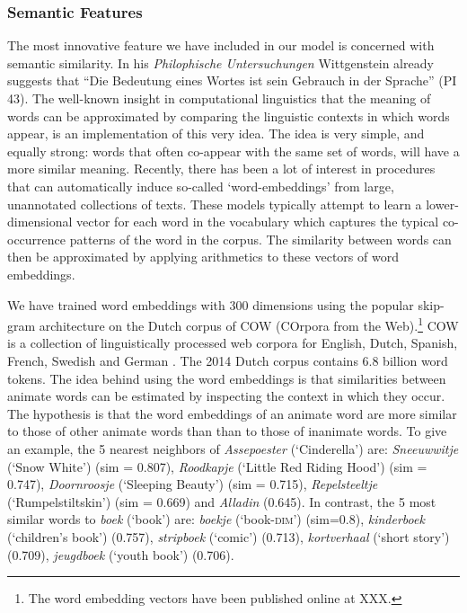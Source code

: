 \documentclass[a4paper,UKenglish]{oasics}
\begin{document}
\subsubsection{Semantic Features} The most innovative feature we have
included in our model is concerned with semantic similarity. In his
\textit{Philophische Untersuchungen} Wittgenstein already suggests
that ``Die Bedeutung eines Wortes ist sein Gebrauch in der Sprache''
(PI 43). The well-known insight in computational linguistics that the
meaning of words can be approximated by comparing the linguistic
contexts in which words appear, is an implementation of this very
idea. The idea is very simple, and equally strong: words that often
co-appear with the same set of words, will have a more similar
meaning. Recently, there has been a lot of interest in procedures that
can automatically induce so-called `word-embeddings' from large,
unannotated collections of texts. These models typically attempt to
learn a lower-dimensional vector for each word in the vocabulary which
captures the typical co-occurrence patterns of the word in the
corpus. The similarity between words can then be approximated by
applying arithmetics to these vectors of word embeddings.

We have trained word embeddings with 300 dimensions using the popular
skip-gram architecture \cite{mikolov:13} on the Dutch corpus of COW
(COrpora from the Web).\footnote{The word embedding vectors have been
  published online at XXX.} COW is a collection of linguistically
processed web corpora for English, Dutch, Spanish, French, Swedish and
German \cite{schaefer:12}. The 2014 Dutch corpus contains 6.8 billion
word tokens. The idea behind using the word embeddings is that
similarities between animate words can be estimated by inspecting the
context in which they occur. The hypothesis is that the word
embeddings of an animate word are more similar to those of other
animate words than than to those of inanimate words. To give an
example, the 5 nearest neighbors of \textit{Assepoester}
(`Cinderella') are: \textit{Sneeuwwitje} (`Snow White') (sim = 0.807),
\textit{Roodkapje} (`Little Red Riding Hood') (sim = 0.747),
\textit{Doornroosje} (`Sleeping Beauty') (sim = 0.715),
\textit{Repelsteeltje} (`Rumpelstiltskin') (sim = 0.669) and
\textit{Alladin} (0.645). In contrast, the 5 most similar words to
\textit{boek} (`book') are: \textit{boekje} (`book-\textsc{dim}')
(sim=0.8), \textit{kinderboek} (`children's book') (0.757),
\textit{stripboek} (`comic') (0.713), \textit{kortverhaal} (`short
story') (0.709), \textit{jeugdboek} (`youth book') (0.706).
\end{document}
